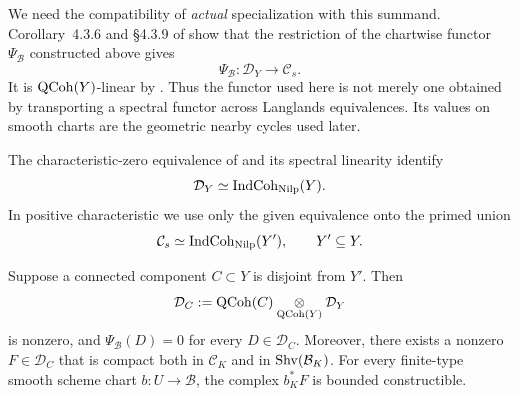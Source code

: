 We need the compatibility of \emph{actual} specialization with this
summand.  Corollary~4.3.6 and \S4.3.9 of \cite{GR} show that the restriction
of the chartwise functor $\Psi_{\mathcal B}$ constructed above gives
\[
 \Psi_{\mathcal B}:\mathcal D_Y\longrightarrow\mathcal C_s.
\]
It is $\operatorname{QCoh}(Y)$-linear by \cite[Theorem~3.1.6(B) and \S4.3.10]{GR}.
Thus the functor used here is not merely one obtained by transporting a
spectral functor across Langlands equivalences.  Its values on smooth charts
are the geometric nearby cycles used later.

The characteristic-zero equivalence of \cite[Theorem~1.3.9(ii)]{GR} and
its spectral linearity identify
\begin{equation}
 \mathcal D_Y\simeq\operatorname{IndCoh}_{\operatorname{Nilp}}(Y).
 \label{eq:spec-generic-equivalence}
\end{equation}
In positive characteristic we use only the given equivalence onto the
primed union
\[
 \mathcal C_s\simeq\operatorname{IndCoh}_{\operatorname{Nilp}}(Y'),\qquad Y'\subseteq Y.
\]

\begin{proposition}
\label{spec:missing}
Suppose a connected component $C\subset Y$ is disjoint from $Y'$.
Then
\[
 \mathcal D_C
 :=\operatorname{QCoh}(C)\underset{\operatorname{QCoh}(Y)}\otimes\mathcal D_Y
\]
is nonzero, and $\Psi_{\mathcal B}(D)=0$ for every
$D\in\mathcal D_C$.  Moreover, there exists a nonzero
$F\in\mathcal D_C$ that is compact both in $\mathcal C_K$ and in
$\operatorname{Shv}(\mathcal B_K)$.  For every finite-type smooth scheme chart
$b:U\to\mathcal B$, the complex $b_K^*F$ is bounded constructible.
\end{proposition}

